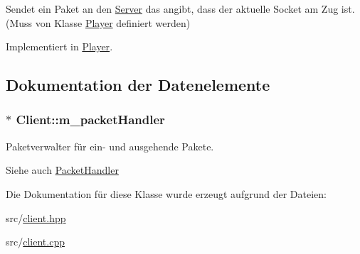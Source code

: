 Sendet ein Paket an den \hyperlink{class_server}{Server} das angibt, dass der aktuelle Socket am Zug ist.~\newline
 (Muss von Klasse \hyperlink{class_player}{Player} definiert werden) 



Implementiert in \hyperlink{class_player_a08220f4cd6aa057071371a7c815a63dd}{Player}.



\subsection{Dokumentation der Datenelemente}
\hypertarget{class_client_a4f9222fa01234b1ebdbe909f13e15744}{}
\subsubsection[{m\+\_\+packet\+Handler}]{$\ast$ Client\+::m\+\_\+packet\+Handler\hspace{0.3cm}{\ttfamily [protected]}}\label{class_client_a4f9222fa01234b1ebdbe909f13e15744}


Paketverwalter für ein-\/ und ausgehende Pakete. 

\begin{DoxySeeAlso}{Siehe auch}
\hyperlink{class_packet_handler}{Packet\+Handler} 
\end{DoxySeeAlso}


Die Dokumentation für diese Klasse wurde erzeugt aufgrund der Dateien\+:\begin{DoxyCompactItemize}
\item 
src/\hyperlink{client_8hpp}{client.\+hpp}\item 
src/\hyperlink{client_8cpp}{client.\+cpp}\end{DoxyCompactItemize}
